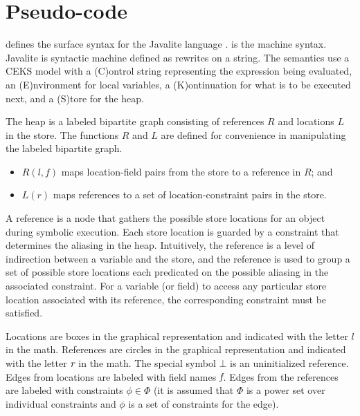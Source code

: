 \section{Pseudo-code}
 defines the surface syntax for the
Javalite language \cite{saints-MS}.  is
the machine syntax. Javalite is syntactic machine
defined as rewrites on a string. The semantics use a CEKS model with a (C)ontrol string representing the expression being
evaluated, an (E)nvironment for local variables, a (K)ontinuation for
what is to be executed next, and a (S)tore for the heap. 




The heap is a labeled bipartite graph consisting of references $R$ and
locations $L$ in the store. The functions $R$ and $L$ are defined for convenience
in manipulating the labeled bipartite graph.
\begin{itemize}
\item $R(l,f)$ maps location-field pairs from the store to a reference in $R$; and
\item $L(r)$ maps references to a set of location-constraint pairs in the store.
\end{itemize}
A reference is a node that gathers the possible store locations for an
object during symbolic execution. Each store location is guarded by a
constraint that determines the aliasing in the heap. Intuitively, the
reference is a level of indirection between a variable and the store,
and the reference is used to group a set of possible store locations
each predicated on the possible aliasing in the associated constraint.
For a variable (or field) to access any particular store location
associated with its reference, the corresponding constraint must be
satisfied.

Locations are boxes in the graphical representation and indicated with
the letter $l$ in the math. References are circles in the graphical
representation and indicated with the letter $\emph{r}$ in the
math. The special symbol $\bot$ is an uninitialized reference. Edges
from locations are labeled with field names $\emph{f}$. Edges from
the references are labeled with constraints $\phi \in \Phi$ (it is
assumed that $\Phi$ is a power set over individual constraints and
$\phi$ is a set of constraints for the edge).

